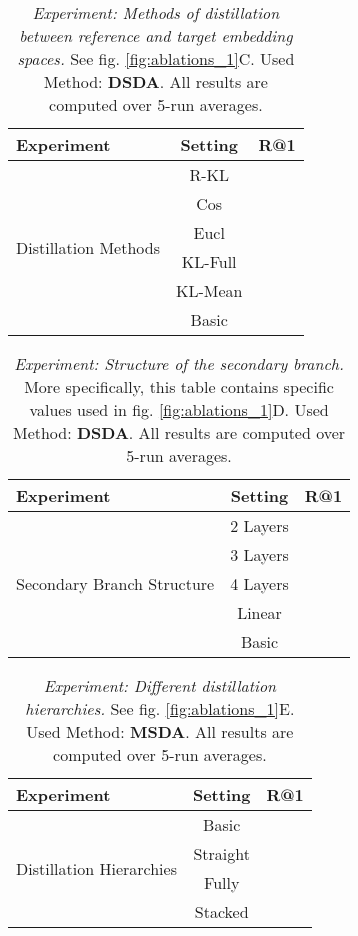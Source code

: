 \documentclass{article} \usepackage{arxiv_style,times}
\begin{document}
 
\begin{table}[h]
 \small
   \centering
    \caption{\textit{Experiment: Methods of distillation between reference and target embedding spaces.} See fig. \ref{fig:ablations_1}C. Used Method: \textbf{DSDA}. All results are computed over 5-run averages.}   
   \begin{tabular}{l||c|c}
     \toprule
     Experiment & Setting & R@1\\
     \midrule
\multirow{7}{*}{Distillation Methods} & R-KL & \\
 & Cos & \\
 & Eucl & \\
 & KL-Full & \\
 & KL-Mean & \\
 & Basic & \\
    \bottomrule
    \end{tabular}
    \label{tab:ablations_3}
 \end{table}
 
 
\begin{table}[h]
 \small
   \centering
    \caption{\textit{Experiment: Structure of the secondary branch.} More specifically, this table contains specific values used in fig. \ref{fig:ablations_1}D. Used Method: \textbf{DSDA}. All results are computed over 5-run averages.}   
   \begin{tabular}{l||c|c}
     \toprule
     Experiment & Setting & R@1\\
     \midrule
\multirow{5}{*}{Secondary Branch Structure} & 2 Layers & \\
 & 3 Layers & \\
 & 4 Layers & \\
 & Linear & \\
 & Basic & \\
    \bottomrule
    \end{tabular}
    \label{tab:ablations_2}
 \end{table}
 

\begin{table}[h]
 \small
   \centering
    \caption{\textit{Experiment: Different distillation hierarchies.} See fig. \ref{fig:ablations_1}E. Used Method: \textbf{MSDA}. All results are computed over 5-run averages.}   
   \begin{tabular}{l||c|c}
     \toprule
     Experiment & Setting & R@1\\
     \midrule
\multirow{4}{*}{Distillation Hierarchies} & Basic & \\
 & Straight & \\
 & Fully & \\
 & Stacked & \\
    \bottomrule
    \end{tabular}
    \label{tab:ablations_10}
 \end{table}
 
\end{document}

